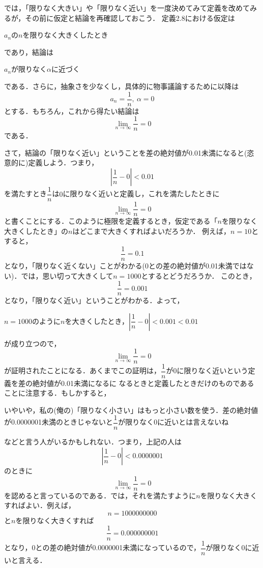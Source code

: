 \documentclass[a4paper,12pt,autodetect-engine,dvipdfmx]{jsarticle}
\theoremstyle{definition}
\begin{document}
では，「限りなく大きい」や「限りなく近い」を一度決めてみて定義を改めてみるが，その前に仮定と結論を再確認しておこう．
定義2.8における仮定は
\begin{center}
    $a_{n}$の$n$を限りなく大きくしたとき
\end{center}
であり，結論は
\begin{center}
    $a_{n}$が限りなく$\alpha$に近づく
\end{center}
である．さらに，抽象さを少なくし，具体的に物事議論するために以降は
$$a_{n} = \dfrac{1}{n},\ \alpha = 0$$
とする．もちろん，これから得たい結論は
$$\lim_{n \to \infty}\dfrac{1}{n} = 0$$
である．

さて，結論の「限りなく近い」ということを差の絶対値が0.01未満になると(恣意的に)定義しよう．つまり，
$$\left|\dfrac{1}{n} - 0\right| < 0.01$$
を満たすとき$\dfrac{1}{n}$は$0$に限りなく近いと定義し，これを満たしたときに
$$\lim_{n \to \infty}\dfrac{1}{n}= 0$$
と書くことにする．このように極限を定義するとき，仮定である「$n$を限りなく大きくしたとき」の$n$はどこまで大きくすればよいだろうか．
例えば，$n=10$とすると，
$$\dfrac{1}{n} = 0.1$$
となり，「限りなく近くない」ことがわかる(0との差の絶対値が0.01未満ではない)．では，思い切って大きくして$n=1000$とするとどうだろうか．
このとき，
$$\dfrac{1}{n} = 0.001$$
となり，「限りなく近い」ということがわかる．よって，
\begin{center}
    $n=1000$のように$n$を大きくしたとき，$\left|\dfrac{1}{n} - 0\right| < 0.001 < 0.01$
\end{center}
が成り立つので，
$$\lim_{n \to \infty}\dfrac{1}{n}= 0$$
が証明されたことになる．あくまでこの証明は，$\dfrac{1}{n}$が0に限りなく近いという定義を差の絶対値が0.01未満になるに
なるときと定義したときだけのものであることに注意する．もしかすると，
\begin{center}
    いやいや，私の(俺の)「限りなく小さい」はもっと小さい数を使う．差の絶対値が0.0000001未満のときじゃないと$\dfrac{1}{n}$が限りなく0に近いとは言えないね
\end{center}
などと言う人がいるかもしれない．つまり，上記の人は
\begin{equation*}
    \left|\dfrac{1}{n} - 0 \right| < 0.0000001
\end{equation*}
のときに
$$\lim_{n \to \infty}\dfrac{1}{n}= 0$$
を認めると言っているのである．では，それを満たすように$n$を限りなく大きくすればよい．例えば，
$$n = 1000000000$$
と$n$を限りなく大きくすれば
$$\dfrac{1}{n} = 0.000000001$$
となり，0との差の絶対値が0.0000001未満になっているので，$\dfrac{1}{n}$が限りなく0に近いと言える．
\end{document}

